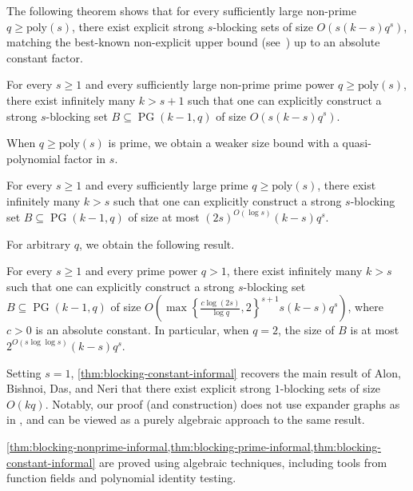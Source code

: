 \documentclass[11pt]{article}
\newcommand{\poly}{\mathrm{poly}}
\DeclareMathOperator{\PG}{PG}
\begin{document}
The following theorem shows that for every sufficiently large non-prime $q\ge \poly(s)$, there exist explicit strong $s$-blocking sets of size $O(s(k-s)q^s)$, matching the best-known non-explicit upper bound (see~\cite[Remark~3.4]{BDGP24}) up to an absolute constant factor.

\begin{theorem}\label{thm:blocking-nonprime-informal}
For every $s\ge 1$ and every sufficiently large non-prime prime power $q\ge \poly(s)$, there exist infinitely many $k>s+1$ such that one can explicitly construct a strong $s$-blocking set $B\subseteq \PG(k-1,q)$ of size $O(s(k-s) q^s)$.
\end{theorem}

When $q\ge \poly(s)$ is prime, we obtain a weaker size bound with a quasi-polynomial factor in $s$.

\begin{theorem}\label{thm:blocking-prime-informal}
For every $s\ge 1$ and every sufficiently large prime $q\ge \poly(s)$, there exist infinitely many $k>s$ such that one can explicitly construct a strong $s$-blocking set $B\subseteq \PG(k-1,q)$ of size at most $(2s)^{O(\log s)} (k-s) q^s$.
\end{theorem}

For arbitrary $q$, we obtain the following result.

\begin{theorem}\label{thm:blocking-constant-informal}
For every $s\ge 1$ and every prime power $q>1$, there exist infinitely many $k>s$ such that one can explicitly construct a strong $s$-blocking set $B\subseteq \PG(k-1,q)$ of size
$O\!\left(\max\left\{\frac{c\log (2s)}{\log q},2\right\}^{s+1} s (k-s) q^s \right)$,
where $c>0$ is an absolute constant. In particular, when $q=2$, the size of $B$ is at most $2^{O(s\log\log s)}(k-s)q^s$.
\end{theorem} 

Setting $s=1$, \cref{thm:blocking-constant-informal} recovers the main result of Alon, Bishnoi, Das, and Neri that there exist explicit strong $1$-blocking sets of size $O(k q)$. Notably, our proof (and construction) does not use expander graphs as in \cite{ABDN24}, and can be viewed as a purely algebraic approach to the same result.

\cref{thm:blocking-nonprime-informal,thm:blocking-prime-informal,thm:blocking-constant-informal} are proved using algebraic techniques, including tools from function fields and polynomial identity testing. 
\end{document}
